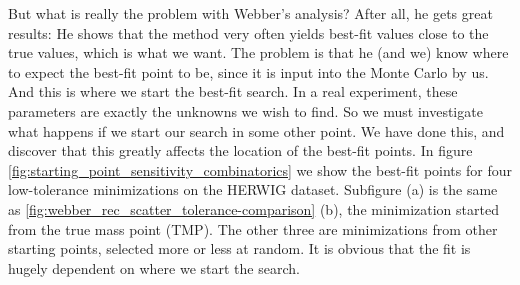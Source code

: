 \documentclass[twoside,english]{uiofysmaster}
\begin{document}
But what is really the problem with Webber's analysis? After all, he gets great results: He shows that the method very often yields best-fit values close to the true values, which is what we want. The problem is that he (and we) know where to expect the best-fit point to be, since it is input into the Monte Carlo by us. And this is where we start the best-fit search. In a real experiment, these parameters are exactly the unknowns we wish to find. So we must investigate what happens if we start our search in some other point. We have done this, and discover that this greatly affects the location of the best-fit points. In figure \ref{fig:starting_point_sensitivity_combinatorics} we show the best-fit points for four low-tolerance minimizations on the {\scshape HERWIG} dataset. Subfigure (a) is the same as \ref{fig:webber_rec_scatter_tolerance-comparison} (b), the minimization started from the true mass point (TMP). The other three are minimizations from other starting points, selected more or less at random. It is obvious that the fit is hugely dependent on where we start the search.
\end{document}

